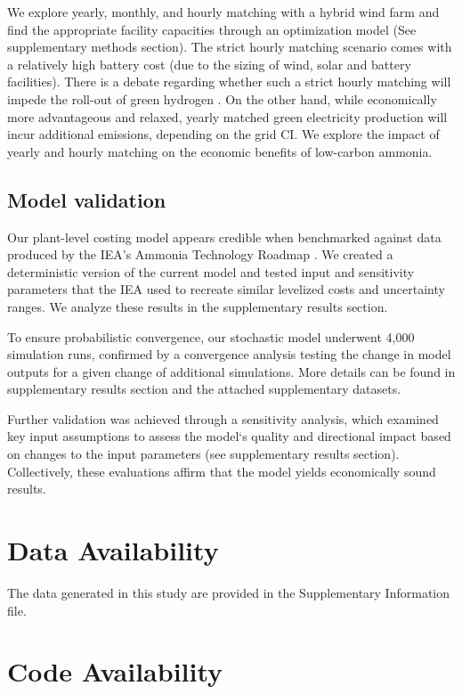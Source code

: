 \documentclass{article}
\begin{document}
 We explore yearly, monthly, and hourly matching with a hybrid wind farm and find the appropriate facility capacities through an optimization model (See supplementary methods section). The strict hourly matching scenario comes with a relatively high battery cost (due to the sizing of wind, solar and battery facilities). There is a debate regarding whether such a strict hourly matching will impede the roll-out of green hydrogen \cite{Cybulsky2023, Ricks2023, BCG2023, Riley2023, Ruhnau2023}. On the other hand, while economically more advantageous and relaxed, yearly matched green electricity production will incur additional emissions, depending on the grid CI. We explore the impact of yearly and hourly matching on the economic benefits of low-carbon ammonia.


\subsection*{Model validation}

Our plant-level costing model appears credible when benchmarked against data produced by the IEA’s Ammonia Technology Roadmap \cite{IEA2021}. We created a deterministic version of the current model and tested input and sensitivity parameters that the IEA used to recreate similar levelized costs and uncertainty ranges. We analyze these results in the supplementary results section. 
	
To ensure probabilistic convergence, our stochastic model underwent 4,000 simulation runs, confirmed by a convergence analysis testing the change in model outputs for a given change of additional simulations. More details can be found in supplementary results section and the attached supplementary datasets.

Further validation was achieved through a sensitivity analysis, which examined key input assumptions to assess the model‘s quality and directional impact based on changes to the input parameters (see supplementary results section). Collectively, these evaluations affirm that the model yields economically sound results.

 \section*{Data Availability}

The data generated in this study are provided in the Supplementary Information file.

\section*{Code Availability}
\end{document}
